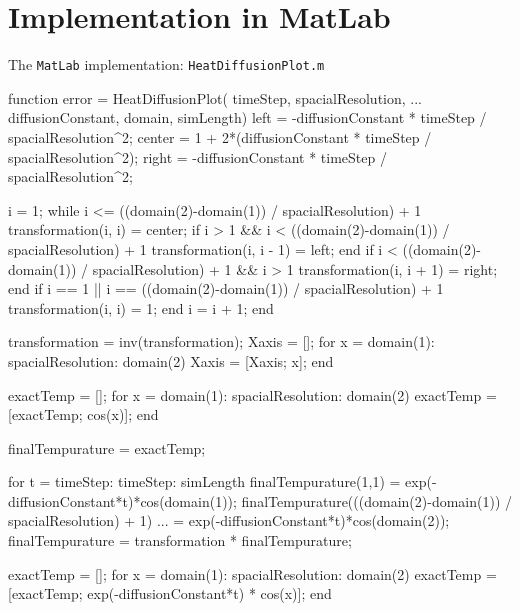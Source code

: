 \documentclass[12pt]{article}
\begin{document}
\section{Implementation in MatLab}\label{sec::appendix}
The \texttt{MatLab} implementation:\newline\newline
\texttt{HeatDiffusionPlot.m}
\begin{verbatimtab}
function error = HeatDiffusionPlot( timeStep, spacialResolution, ...
                                           diffusionConstant, domain, simLength)
    left = -diffusionConstant * timeStep / spacialResolution^2;
    center = 1 + 2*(diffusionConstant * timeStep / spacialResolution^2);
    right = -diffusionConstant * timeStep / spacialResolution^2;

    i = 1;
    while i <= ((domain(2)-domain(1)) / spacialResolution) + 1
        transformation(i, i) = center;
        if i > 1 && i < ((domain(2)-domain(1)) / spacialResolution) + 1
            transformation(i, i - 1) = left;
        end
        if i < ((domain(2)-domain(1)) / spacialResolution) + 1 && i > 1
            transformation(i, i + 1) = right;
        end
        if i == 1 || i == ((domain(2)-domain(1)) / spacialResolution) + 1
            transformation(i, i) = 1;
        end
        i = i + 1;
    end

    transformation = inv(transformation);
    Xaxis = [];
    for x = domain(1): spacialResolution: domain(2)
        Xaxis = [Xaxis; x];
    end

    exactTemp = [];
    for x = domain(1): spacialResolution: domain(2)
        exactTemp = [exactTemp; cos(x)];
    end
    
    finalTempurature = exactTemp;

    for t = timeStep: timeStep: simLength
        finalTempurature(1,1) = exp(-diffusionConstant*t)*cos(domain(1));
        finalTempurature(((domain(2)-domain(1)) / spacialResolution) + 1) ...
                        = exp(-diffusionConstant*t)*cos(domain(2));
        finalTempurature = transformation * finalTempurature;
        
        exactTemp = [];
        for x = domain(1): spacialResolution: domain(2)
            exactTemp = [exactTemp; exp(-diffusionConstant*t) * cos(x)];
        end
    

\end{verbatimtab}
\end{document}
